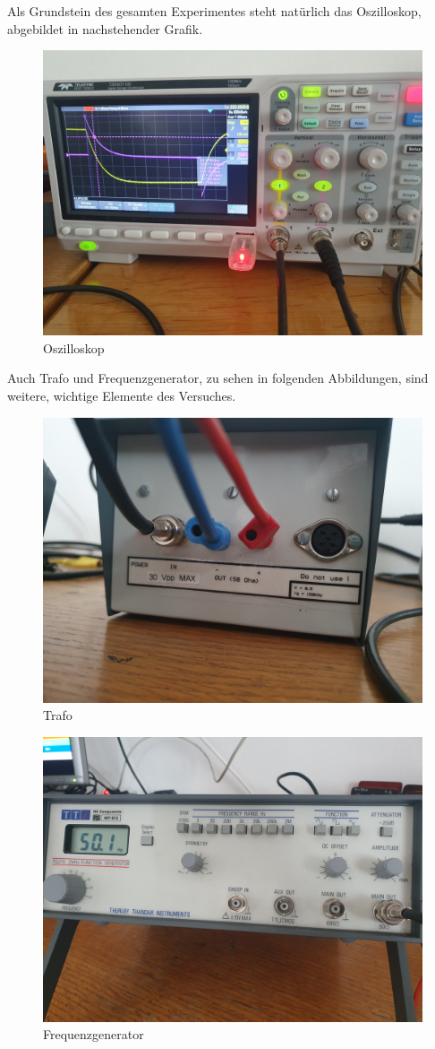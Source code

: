 \documentclass[12pt,a4paper,twoside]{article}
\begin{document}
Als Grundstein des gesamten Experimentes steht natürlich das Oszilloskop, abgebildet in nachstehender Grafik.

\begin{figure}[H]
    \centering
    \includegraphics[width=0.6\linewidth, angle=0]{nudes/Osziloskop.jpg}
    \caption{Oszilloskop}
    \label{fig:Oszilloskop}
\end{figure}

\noindent
Auch Trafo und Frequenzgenerator, zu sehen in folgenden Abbildungen, sind weitere, wichtige Elemente des Versuches. 

\begin{figure}[H]
    \centering
    \includegraphics[width=0.6\linewidth, angle=0]{nudes/Trafo.jpg}
    \caption{Trafo}
    \label{fig:Trafo}
\end{figure}

\begin{figure}[H]
    \centering
    \includegraphics[width=0.6\linewidth, angle=0]{nudes/Frequenzgenerator.jpg}
    \caption{Frequenzgenerator}
    \label{fig:Frequenzgenerator}
\end{figure}
\end{document}

